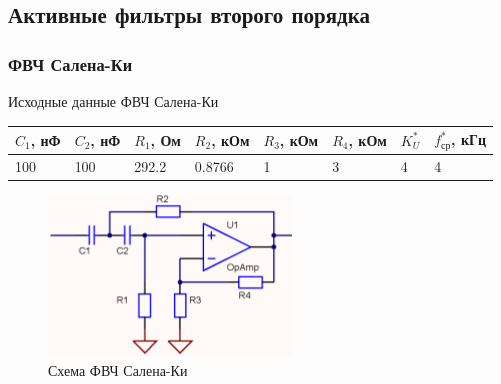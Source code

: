 \documentclass[a4paper, 12pt]{article}
\begin{document}
    \subsection{Активные фильтры второго порядка}
    \subsubsection{ФВЧ Салена-Ки} \label{sec:hpsk}
    Исходные данные ФВЧ Салена-Ки
    \begin{center}
        \begin{tabular}{ | m{3.5em} | m{3.5em}| m{3.5em} | m{4em} | m{4em} | m{4em} | m{2.5em} | m{3.5em} |} 
        \hline
        $C_1$, нФ&$C_2$, нФ&$R_1$, Ом&$R_2$, кОм&$R_3$, кОм&$R_4$, кОм&$K_U^*$&$f_\text{ср}^*$, кГц\\ 
        \hline
        100&100&292.2&0.8766&1&3&4&4\\ 
        \hline
        \end{tabular}
    \end{center}
    \begin{figure}[H]
        \centering
        \includegraphics{high_pass_sk.png}
        \captionsetup{skip=0pt}
        \caption{Схема ФВЧ Салена-Ки}
        \label{fig:null_scheme3}
    \end{figure}
\end{document}
